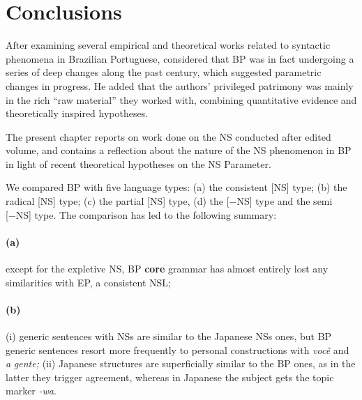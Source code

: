 \documentclass[output=paper]{langsci/langscibook}
\begin{document}
\section{Conclusions}\label{sec:key:26.4}

After examining several empirical and theoretical works related to syntactic
phenomena in Brazilian Portuguese, \citet[411]{Roberts1993b} considered that
\gls{BP} was in fact undergoing a series of deep
changes along the past century, which suggested parametric changes in progress.
He added that the authors’ privileged patrimony was mainly in the rich “raw
material” they worked with, combining quantitative evidence and theoretically
inspired hypotheses.

The present chapter reports on work done on the NS conducted after
 edited volume, and contains a reflection about the nature
of the NS phenomenon in \gls{BP} in light of recent
theoretical hypotheses on the NS Parameter.

We compared \gls{BP} with five language types: (a) the
consistent [NS] type; (b) the radical [NS] type; (c) the partial [NS] type, (d)
the [−NS] type and the semi [−NS] type.  The comparison has led to the
following summary:

\paragraph*{(a)} except for the expletive NS, \gls{BP}
\textbf{core} grammar has almost entirely lost any similarities with
\gls{EP}, a consistent \gls{NSL};

\paragraph*{(b)} (i) generic sentences with NSs are similar to the Japanese NSs
ones, but \gls{BP} generic sentences resort more
frequently to personal constructions with \emph{você} and \emph{a}
\emph{gente;} (ii) Japanese  structures are superficially similar to the
\gls{BP} ones,  as in the latter they trigger
agreement, whereas in Japanese the subject gets the topic marker \emph{-wa}.
\end{document}
